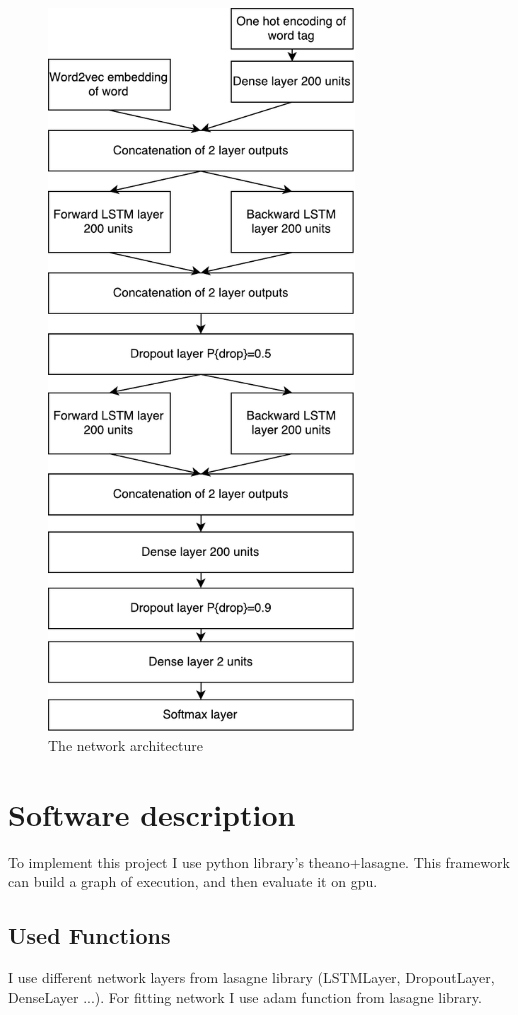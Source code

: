 \documentclass[a4paper,12pt,oneside]{article}
\begin{document}
\begin{figure}[t]%
	\centering
	\includegraphics[width=230pt]{compression_network}
	\caption{The network architecture}%
	\label{fig:network}%
\end{figure}


\section{Software description}
To implement this project I use python library's theano+lasagne. This framework can build a graph of execution, and then evaluate it on gpu.

\subsection{Used Functions}
I use different network layers from lasagne library (LSTMLayer, DropoutLayer, DenseLayer ...). For fitting network I use adam function from lasagne library.
\end{document}
